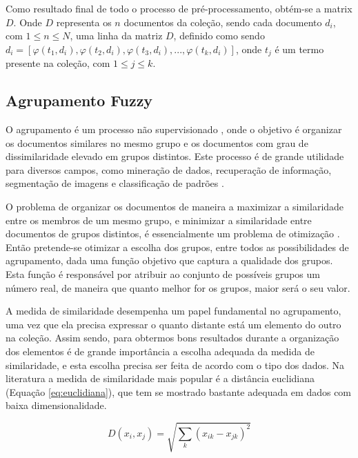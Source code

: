 Como resultado final de todo o processo de pré-processamento, obtém-se a matrix $D$. Onde $D$ 
representa os $n$ documentos da coleção, sendo cada documento $d_{i}$, com $1 \leq n \leq N$, 
uma linha da matriz $D$, definido como sendo 
$ d_{i} = [\varphi(t_{1},d_{i}),\varphi(t_{2},d_{i}),\varphi(t_{3},d_{i}),...,\varphi(t_{k},d_{i})] $,
onde $t_{j}$ é um termo presente na coleção, com $1 \leq j \leq k$.

\subsection{Agrupamento Fuzzy}
O agrupamento é um processo não supervisionado \cite{Feldman2007}, onde o objetivo é organizar os 
documentos similares no mesmo grupo e os documentos com grau de dissimilaridade elevado em 
grupos distintos\cite{Nogueira2013}\cite{Feldman2007}. Este processo é de grande 
utilidade para diversos campos, como mineração de dados, recuperação de informação, 
segmentação de imagens e classificação de padrões \cite{Feldman2007}.

O problema de organizar os documentos de maneira a maximizar a similaridade entre os membros
de um mesmo grupo, e minimizar a similaridade entre documentos de grupos distintos, é 
essencialmente um problema de otimização \cite{Feldman2007}. 
Então pretende-se otimizar a escolha dos grupos, entre todos as possibilidades de agrupamento, 
dada uma função objetivo que captura a qualidade dos grupos. Esta função
é responsável por atribuir ao conjunto de possíveis grupos um número real, de maneira que quanto 
melhor for os grupos, maior será o seu valor\cite{Feldman2007}.

A medida de similaridade desempenha um papel fundamental no agrupamento, uma vez que ela 
precisa expressar o quanto distante está um elemento do outro na coleção. Assim sendo, para 
obtermos bons resultados durante a organização dos elementos é de grande importância a escolha
adequada da medida de similaridade, e esta escolha precisa ser feita de acordo com o tipo dos dados.
Na literatura a medida de similaridade mais popular\cite{Feldman2007} é a distância 
euclidiana (Equação \ref{eq:euclidiana}),
que tem se mostrado bastante adequada em dados com baixa dimensionalidade.

\begin{equation}
D(x_{i}, x_{j}) = \sqrt{\sum_k{(x_{ik}-x_{jk})^2}}
\label{eq:euclidiana}
\end{equation}

